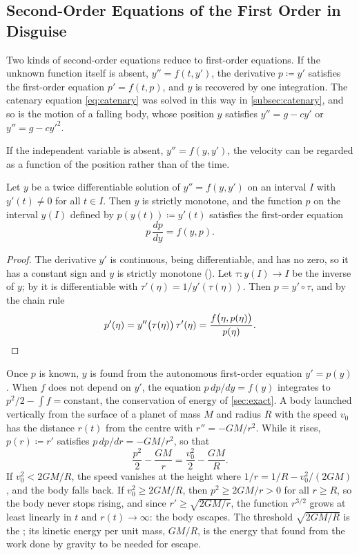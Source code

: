 \subsection{Second-Order Equations of the First Order in Disguise}

Two kinds of second-order equations reduce to first-order equations. If the unknown function itself is absent, $y''=f(t,y')$, the derivative $p\coloneqq y'$ satisfies the first-order equation $p'=f(t,p)$, and $y$ is recovered by one integration. The catenary equation \eqref{eq:catenary} was solved in this way in \cref{subsec:catenary}, and so is the motion of a falling body, whose position $y$ satisfies $y''=g-cy'$ or $y''=g-cy'^2$.

If the independent variable is absent, $y''=f(y,y')$, the velocity can be regarded as a function of the position rather than of the time.

\begin{proposition}
\label{prop:reduction-autonomous}
Let $y$ be a twice differentiable solution of $y''=f(y,y')$ on an interval $I$ with $y'(t)\ne0$ for all $t\in I$. Then $y$ is strictly monotone, and the function $p$ on the interval $y(I)$ defined by $p(y(t))\coloneqq y'(t)$ satisfies the first-order equation
\[
p\,\frac{dp}{dy}=f(y,p) .
\]
\end{proposition}

\begin{proof}
The derivative $y'$ is continuous, being differentiable, and has no zero, so it has a constant sign and $y$ is strictly monotone (). Let $\tau\colon y(I)\to I$ be the inverse of $y$; by  it is differentiable with $\tau'(\eta)=1/y'(\tau(\eta))$. Then $p=y'\circ\tau$, and by the chain rule
\[
p'(\eta)=y''\bigl(\tau(\eta)\bigr)\,\tau'(\eta)=\frac{f\bigl(\eta,p(\eta)\bigr)}{p(\eta)} .\qedhere
\]
\end{proof}

Once $p$ is known, $y$ is found from the autonomous first-order equation $y'=p(y)$. When $f$ does not depend on $y'$, the equation $p\,dp/dy=f(y)$ integrates to $p^2/2-\int f=\text{constant}$, the conservation of energy of \cref{sec:exact}. A body launched vertically from the surface of a planet of mass $M$ and radius $R$ with the speed $v_0$ has the distance $r(t)$ from the centre with $r''=-GM/r^2$. While it rises, $p(r)\coloneqq r'$ satisfies $p\,dp/dr=-GM/r^2$, so that
\[
\frac{p^2}2-\frac{GM}r=\frac{v_0^2}2-\frac{GM}R .
\]
If $v_0^2<2GM/R$, the speed vanishes at the height where $1/r=1/R-v_0^2/(2GM)$, and the body falls back. If $v_0^2\ge2GM/R$, then $p^2\ge2GM/r>0$ for all $r\ge R$, so the body never stops rising, and since $r'\ge\sqrt{2GM/r}$, the function $r^{3/2}$ grows at least linearly in $t$ and $r(t)\to\infty$: the body escapes. The threshold $\sqrt{2GM/R}$ is the ; its kinetic energy per unit mass, $GM/R$, is the energy that  found from the work done by gravity to be needed for escape.

